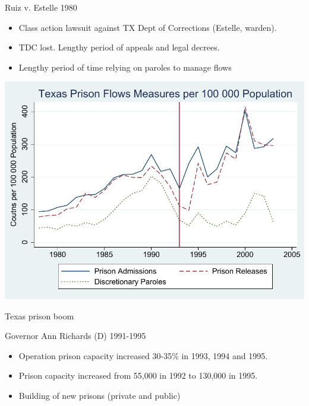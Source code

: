 \documentclass{beamer}
\begin{document}
\begin{frame}{Ruiz v. Estelle 1980}

	
	\begin{itemize}
		\item Class action lawsuit against TX Dept of Corrections (Estelle, warden). 
		\item TDC lost.  Lengthy period of appeals and legal decrees.  
		\item Lengthy period of time relying on paroles to manage flows
	\end{itemize}
\end{frame}

\begin{frame}[plain]
  \includegraphics[scale=0.8]{./lecture_includes/flow_rate_figure.pdf}
\end{frame}

\begin{frame}{Texas prison boom}

Governor Ann Richards (D) 1991-1995
		\begin{itemize}
		\item Operation prison capacity increased 30-35\% in 1993, 1994 and 1995. 
		\item Prison capacity increased from 55,000 in 1992 to 130,000 in 1995.  
		\item Building of new prisons (private and public)
		\end{itemize} 
\end{frame}
\end{document}
